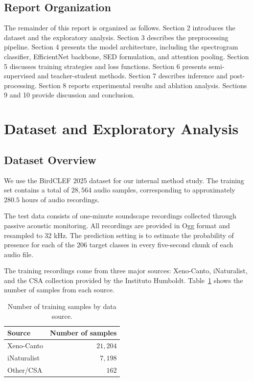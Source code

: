 \documentclass[a4paper,12pt]{article}
\begin{document}
\subsection{Report Organization}
The remainder of this report is organized as follows. Section 2 introduces the dataset and the exploratory analysis. Section 3 describes the preprocessing pipeline. Section 4 presents the model architecture, including the spectrogram classifier, EfficientNet backbone, SED formulation, and attention pooling. Section 5 discusses training strategies and loss functions. Section 6 presents semi-supervised and teacher-student methods. Section 7 describes inference and post-processing. Section 8 reports experimental results and ablation analysis. Sections 9 and 10 provide discussion and conclusion.

\section{Dataset and Exploratory Analysis}

\subsection{Dataset Overview}
We use the BirdCLEF 2025 dataset for our internal method study. The training set contains a total of $28{,}564$ audio samples, corresponding to approximately $280.5$ hours of audio recordings.

The test data consists of one-minute soundscape recordings collected through passive acoustic monitoring. All recordings are provided in Ogg format and resampled to $32$ kHz. The prediction setting is to estimate the probability of presence for each of the $206$ target classes in every five-second chunk of each audio file.

The training recordings come from three major sources: Xeno-Canto, iNaturalist, and the CSA collection provided by the Instituto Humboldt. Table~\ref{tab:samples-by-source} shows the number of samples from each source.

\begin{table}[htbp]
\centering
\caption{Number of training samples by data source.}
\label{tab:samples-by-source}
\begin{tabular}{lr}
\toprule
\textbf{Source} & \textbf{Number of samples} \\
\midrule
Xeno-Canto & $21{,}204$ \\
iNaturalist & $7{,}198$ \\
Other/CSA & $162$ \\
\bottomrule
\end{tabular}
\end{table}
\end{document}
